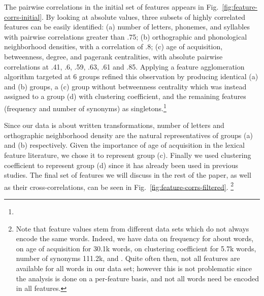 \begin{new}

The pairwise correlations in the initial set of features appears in Fig.~\ref{fig:feature-corrs-initial}.
By looking at absolute values, three subsets of highly correlated features can be easily identified:
(a) number of letters, phonemes, and syllables with pairwise correlations greater than .75;
(b) orthographic and phonological neighborhood densities, with a correlation of .8;
(c) age of acquisition, betweenness, degree, and pagerank centralities, with absolute pairwise correlations at .41, .6, .59, .63, .61 and .85.
Applying a feature agglomeration algorithm targeted at 6 groups refined this observation by producing identical (a) and (b) groups, a (c) group without betweenness centrality which was instead assigned to a group (d) with clustering coefficient, and the remaining features (frequency and number of synonyms) as singletons.\footnote{
}

Since our data is about written transformations, number of letters and orthographic neighborhood density are the natural representatives of groups (a) and (b) respectively.
Given the importance of age of acquisition in the lexical feature literature, we chose it to represent group (c).
Finally we used clustering coefficient to represent group (d) since it has already been used in previous studies.
The final set of features we will discuss in the rest of the paper, as well as their cross-correlations, can be seen in Fig.~\ref{fig:feature-corrs-filtered}.%
\footnote{
Note that feature values stem from different data sets which do not always encode the same words.
Indeed, we have data on frequency for about  words, on age of acquisition for 30.1k words, on clustering coefficient for 5.7k words, number of synonyms 111.2k, and .
Quite often then, not all features are available for all words in our data set;
however this is not problematic since the analysis is done on a per-feature basis, and not all words need be encoded in all features.}

\end{new}

